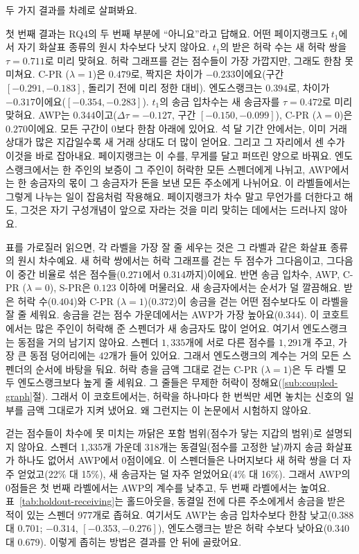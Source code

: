



두 가지 결과를 차례로 살펴봐요.

첫 번째 결과는 RQ4의 두 번째 부분에 “아니요”라고 답해요. 어떤 페이지랭크도 $t_1$에서 자기 화살표 종류의 원시 차수보다 낫지 않아요. $t_1$의 받은 허락 수는 새 허락 쌍을 $\tau=0.711$로 미리 맞혀요. 허락 그래프를 걷는 점수들이 가장 가깝지만, 그래도 한참 못 미쳐요. C-PR ($\lambda=1$)은 $0.479$로, 짝지은 차이가 $-0.233$이에요(구간 $[-0.291,-0.183]$, 돌리기 전에 미리 정한 대비). 엔도스랭크는 $0.394$로, 차이가 $-0.317$이에요($[-0.354,-0.283]$). $t_1$의 송금 입차수는 새 송금자를 $\tau=0.472$로 미리 맞혀요. AWP는 $0.344$이고($\Delta\tau=-0.127$, 구간 $[-0.150,-0.099]$), C-PR ($\lambda=0$)은 $0.270$이에요. 모든 구간이 0보다 한참 아래에 있어요. 석 달 기간 안에서는, 이미 거래 상대가 많은 지갑일수록 새 거래 상대도 더 많이 얻어요. 그리고 그 자리에서 센 수가 이것을 바로 잡아내요. 페이지랭크는 이 수를, 무게를 달고 퍼뜨린 양으로 바꿔요. 엔도스랭크에서는 한 주인의 보증이 그 주인이 허락한 모든 스펜더에게 나뉘고, AWP에서는 한 송금자의 몫이 그 송금자가 돈을 보낸 모든 주소에게 나뉘어요. 이 라벨들에서는 그렇게 나누는 일이 잡음처럼 작용해요. 페이지랭크가 차수 말고 무언가를 더한다고 해도, 그것은 자기 구성개념이 앞으로 자라는 것을 미리 맞히는 데에서는 드러나지 않아요.

표를 가로질러 읽으면, 각 라벨을 가장 잘 줄 세우는 것은 그 라벨과 같은 화살표 종류의 원시 차수예요. 새 허락 쌍에서는 허락 그래프를 걷는 두 점수가 그다음이고, 그다음이 중간 비율로 섞은 점수들($0.271$에서 $0.314$까지)이에요. 반면 송금 입차수, AWP, C-PR ($\lambda=0$), S-PR은 $0.123$ 이하에 머물러요. 새 송금자에서는 순서가 덜 깔끔해요. 받은 허락 수($0.404$)와 C-PR ($\lambda=1$)($0.372$)이 송금을 걷는 어떤 점수보다도 이 라벨을 잘 줄 세워요. 송금을 걷는 점수 가운데에서는 AWP가 가장 높아요($0.344$). 이 코호트에서는 많은 주인이 허락해 준 스펜더가 새 송금자도 많이 얻어요. 여기서 엔도스랭크는 동점을 거의 남기지 않아요. 스펜더 $1{,}335$개에 서로 다른 점수를 $1{,}291$개 주고, 가장 큰 동점 덩어리에는 $42$개가 들어 있어요. 그래서 엔도스랭크의 계수는 거의 모든 스펜더의 순서에 바탕을 둬요. 허락 층을 금액 그대로 걷는 C-PR ($\lambda=1$)은 두 라벨 모두 엔도스랭크보다 높게 줄 세워요. 그 줄들은 무제한 허락이 정해요(\ref{sub:coupled-graph}절). 그래서 이 코호트에서는, 허락을 하나마다 한 번씩만 세면 놓치는 신호의 일부를 금액 그대로가 지켜 냈어요. 왜 그런지는 이 논문에서 시험하지 않아요.

걷는 점수들이 차수에 못 미치는 까닭은 포함 범위(점수가 닿는 지갑의 범위)로 설명되지 않아요. 스펜더 1,335개 가운데 318개는 동결일(점수를 고정한 날)까지 송금 화살표가 하나도 없어서 AWP에서 0점이에요. 이 스펜더들은 나머지보다 새 허락 쌍을 더 자주 얻었고(22\% 대 15\%), 새 송금자는 덜 자주 얻었어요(4\% 대 16\%). 그래서 AWP의 0점들은 첫 번째 라벨에서는 AWP의 계수를 낮추고, 두 번째 라벨에서는 높여요. 표~\ref{tab:holdout-receiving}는 홀드아웃을, 동결일 전에 다른 주소에게서 송금을 받은 적이 있는 스펜더 977개로 좁혀요. 여기서도 AWP는 송금 입차수보다 한참 낮고($0.388$ 대 $0.701$; $-0.314$, $[-0.353,-0.276]$), 엔도스랭크는 받은 허락 수보다 낮아요($0.340$ 대 $0.679$). 이렇게 좁히는 방법은 결과를 안 뒤에 골랐어요.

